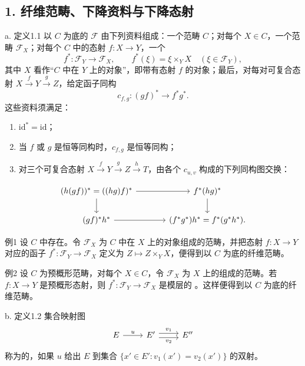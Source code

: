\subsection*{1. 纤维范畴、下降资料与下降态射}
\begin{statement}{a. 定义1.1}
以 $C$ 为底的 $\mathcal F$ 由下列资料组成：一个范畴 $C$；对每个 $X\in C$，一个范畴 $\mathcal F_X$；对每个 $C$ 中的态射 $f:X\to Y$，一个
\[
f^*:\mathcal F_Y\longrightarrow\mathcal F_X,
\qquad f^*(\xi)=\xi\times_Y X\quad(\xi\in\mathcal F_Y),
\]
其中 $X$ 看作“$C$ 中在 $Y$ 上的对象”，即带有态射 $f$ 的对象；最后，对每对可复合态射 $X\xrightarrow fY\xrightarrow gZ$，给定函子同构
\[
c_{f,g}:(gf)^*\longrightarrow f^*g^*.
\]
这些资料须满足：
\begin{enumerate}[label=(\roman*)]
\item $\mathrm{id}^*=\mathrm{id}$；
\item 当 $f$ 或 $g$ 是恒等同构时，$c_{f,g}$ 是恒等同构；
\item 对三个可复合态射 $X\xrightarrow fY\xrightarrow gZ\xrightarrow hT$，由各个 $c_{u,v}$ 构成的下列同构图交换：
\end{enumerate}
\[
\begin{tikzcd}[column sep=large]
(h(gf))^*=((hg)f)^* \arrow[r] \arrow[d] & f^*(hg)^* \arrow[d]\\
(gf)^*h^* \arrow[r] & (f^*g^*)h^*=f^*(g^*h^*).
\end{tikzcd}
\]
\end{statement}
\begin{statement}{例1}
设 $C$ 中存在。令 $\mathcal F_X$ 为 $C$ 中在 $X$ 上的对象组成的范畴，并把态射 $f:X\to Y$ 对应的函子 $f^*:\mathcal F_Y\to\mathcal F_X$ 定义为 $Z\mapsto Z\times_YX$，便得到以 $C$ 为底的纤维范畴。
\end{statement}
\begin{statement}{例2}
设 $C$ 为预概形范畴，对每个 $X\in C$，令 $\mathcal F_X$ 为 $X$ 上的组成的范畴。若 $f:X\to Y$ 是预概形态射，则 $f^*:\mathcal F_Y\to\mathcal F_X$ 是模层的
。这样便得到以 $C$ 为底的纤维范畴。
\end{statement}
\begin{statement}{b. 定义1.2}
集合映射图
\[
\begin{tikzcd}
E\arrow[r,"u"]&E'\arrow[r,shift left=.6ex,"v_1"]\arrow[r,shift right=.6ex,"v_2"']&E''
\end{tikzcd}
\]
称为的，如果 $u$ 给出 $E$ 到集合 $\{x'\in E':v_1(x')=v_2(x')\}$ 的双射。
\end{statement}
